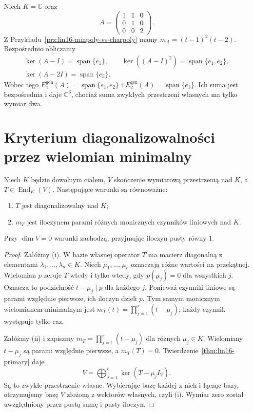 \begin{przyklad}
\label{prz:lin16-generalized-example}
Niech \(K=\mathbb C\) oraz
\[
 A=\begin{pmatrix}
 1&1&0\\0&1&0\\0&0&2
 \end{pmatrix}.
\]
Z Przykładu~\ref{prz:lin16-minpoly-vs-charpoly}
mamy \(m_A=(t-1)^2(t-2)\).
Bezpośrednio obliczamy
\[
 \begin{gathered}
 \ker(A-I)=\operatorname{span}\{e_1\},
 \qquad
 \ker((A-I)^2)=\operatorname{span}\{e_1,e_2\},\\
 \ker(A-2I)=\operatorname{span}\{e_3\}.
 \end{gathered}
\]
Wobec tego
\(E_1^{\mathrm{gen}}(A)=\operatorname{span}\{e_1,e_2\}\)
i \(E_2^{\mathrm{gen}}(A)=\operatorname{span}\{e_3\}\).
Ich suma jest bezpośrednia i daje \(\mathbb C^3\),
chociaż suma zwykłych przestrzeni własnych
ma tylko wymiar dwa.
\end{przyklad}

\section{Kryterium diagonalizowalności przez wielomian minimalny}
\label{sec:lin16-diagonalization}

\begin{twierdzenie}
\label{thm:lin16-minpoly-diagonalizable}
Niech \(K\) będzie dowolnym ciałem,
\(V\) skończenie wymiarową przestrzenią
nad \(K\), a \(T\in\operatorname{End}_K(V)\).
Następujące warunki są równoważne:
\begin{enumerate}[label=(\roman*)]
\item \(T\) jest diagonalizowalny nad \(K\);
\item \(m_T\) jest iloczynem
      parami różnych monicznych czynników liniowych
      nad \(K\).
\end{enumerate}
Przy \(\dim V=0\) warunki zachodzą,
przyjmując iloczyn pusty równy \(1\).
\end{twierdzenie}
\begin{proof}
Załóżmy (i).
W bazie własnej operator \(T\)
ma macierz diagonalną z elementami
\(\lambda_1,\ldots,\lambda_n\in K\).
Niech \(\mu_1,\ldots,\mu_r\)
oznaczają różne wartości na przekątnej.
Wielomian \(p\) zeruje \(T\)
wtedy i tylko wtedy, gdy
\(p(\mu_j)=0\) dla wszystkich \(j\).
Oznacza to podzielność \(t-\mu_j\mid p\)
dla każdego \(j\).
Ponieważ czynniki liniowe są parami
względnie pierwsze, ich iloczyn dzieli \(p\).
Tym samym monicznym wielomianem minimalnym
jest
\(m_T(t)=\prod_{j=1}^r(t-\mu_j)\);
każdy czynnik występuje tylko raz.

Załóżmy (ii) i zapiszmy
\(m_T=\prod_{j=1}^r(t-\mu_j)\)
dla różnych \(\mu_j\in K\).
Wielomiany \(t-\mu_j\) są
parami względnie pierwsze,
a \(m_T(T)=0\).
Twierdzenie~\ref{thm:lin16-primary}
daje
\[
 V=\bigoplus_{j=1}^r
       \ker(T-\mu_jI_V).
\]
Są to zwykłe przestrzenie własne.
Wybierając bazę każdej z nich
i łącząc bazy, otrzymujemy
bazę \(V\) złożoną z wektorów własnych,
czyli (i). Wymiar zero został
uwzględniony przez pustą sumę i pusty iloczyn.
\end{proof}

